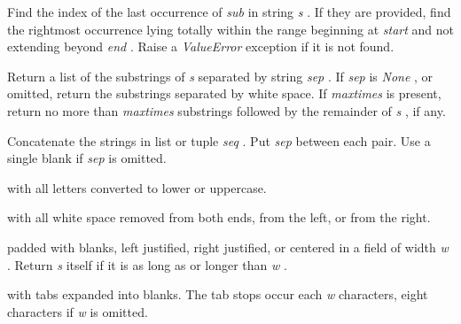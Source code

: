 Find the index of the last
occurrence of \emph{sub} in string \emph{s} . If they are provided, find
the rightmost occurrence lying totally within the range beginning at
\emph{start} and not extending beyond \emph{end} . Raise a
\emph{ValueError} exception if it is not found.













Return a list of the substrings of
\emph{s} separated by string \emph{sep} . If \emph{sep} is \emph{None} ,
or omitted, return the substrings separated by white space. If
\emph{maxtimes} is present, return no more than \emph{maxtimes}
substrings followed by the remainder of \emph{s} , if any.







Concatenate the strings in list or
tuple \emph{seq} . Put \emph{sep} between each pair. Use a single blank
if \emph{sep} is omitted.









 with all
letters converted to lower or uppercase.













 with all
white space removed from both ends, from the left, or from the right.













 padded
with blanks, left justified, right justified, or centered in a field of
width \emph{w} . Return \emph{s} itself if it is as long as or longer
than \emph{w} .









 with
tabs expanded into blanks. The tab stops occur each \emph{w} characters,
eight characters if \emph{w} is omitted.

